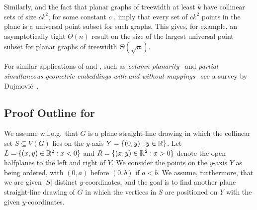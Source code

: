 Similarly,  and the fact that planar graphs of
treewidth at least $k$ have collinear sets of size $ck^2$, for some
constant $c$ \cite{dalozzo.dujmovic.ea:drawing}, imply that every set
of  $c k^2$ points in the plane is a universal point subset for  such
graphs. This gives, for example, an asymptotically tight  $\Theta(n)$
result on the size of the largest universal point subset for planar
graphs of treewidth $\Theta(\sqrt{n})$. 

For similar applications of 
and , such as \emph{column
planarity}~\cite{behks-cppsge-17,dalozzo.dujmovic.ea:drawing,dujmovic:utility}
and \emph{partial simultaneous geometric embeddings with and without
mappings}~\cite{behks-cppsge-17,ddlmw-pqp-15,dujmovic:utility} see a
survey by Dujmovi\'c~\cite{dujmovic:utility}.



\subsection{Proof Outline for }

We assume w.l.o.g.\ that $G$ is a plane straight-line
drawing in which the collinear set $S\subseteq V(G)$ lies
on the $y$-axis $Y=\{(0,y):y\in\mathbb{R}\}$. Let
$L=\{(x,y)\in\mathbb{R}^2:x<0\}$ and $R=\{(x,y)\in\mathbb{R}^2: x >0\}$ denote the open
halfplanes to the left and right of $Y$.
We consider the points on the $y$-axis $Y$ as being ordered,
with $(0,a)$ before $(0,b)$ if $a<b$. 
We
assume, furthermore, that we are given $|S|$ distinct $y$-coordinates,
and the goal is to find another plane straight-line drawing of $G$ in
which the vertices in $S$ are positioned on $Y$ with the given $y$-coordinates.



